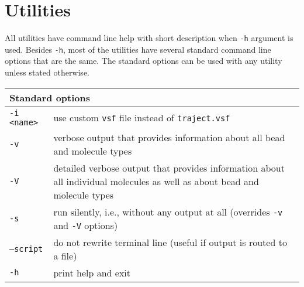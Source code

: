 \chapter{Utilities} \label{chap:Utils}

All utilities have command line help with short description when
\texttt{-h} argument is used. Besides \texttt{-h}, most of the utilities
have several standard command line options that are the same. The standard
options can be used with any utility unless stated otherwise.

\vspace{1em}
\noindent
\begin{tabular}{p{}p{}}
  \toprule
  \multicolumn{2}{l}{Standard options} \\
  \midrule
  \texttt{-i <name>} & use custom \texttt{vsf} file instead of
    \texttt{traject.vsf} \\
  \texttt{-v}        & verbose output that provides information about all
    bead and molecule types \\
  \texttt{-V}        & detailed verbose output that provides
    information about all individual molecules as well as about bead and
    molecule types \\
  \texttt{-s}        & run silently, i.e., without any output at all
    (overrides \texttt{-v} and \texttt{-V} options) \\
  \texttt{--script}  & do not rewrite terminal line (useful if output is
    routed to a file) \\
  \texttt{-h}        & print help and exit \\
  \bottomrule
\end{tabular}











%











